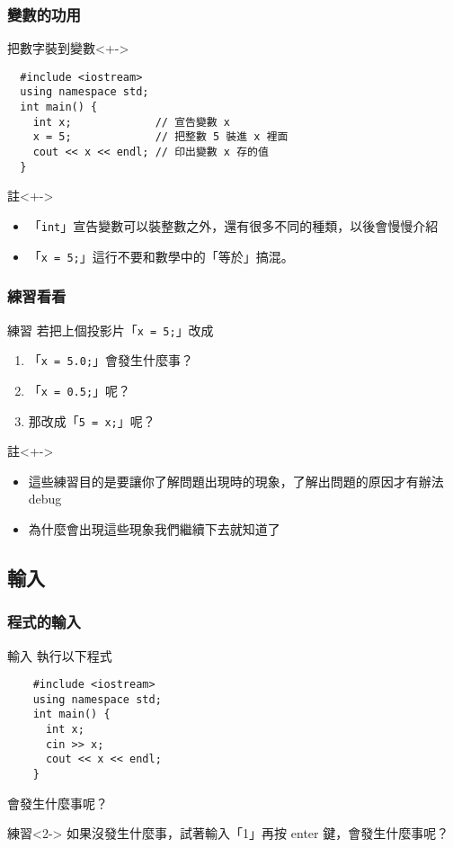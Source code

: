 \documentclass[utf8]{beamer}
\begin{document}
\begin{CJK}{UTF8}{bkai}
\begin{frame}[fragile]
  \frametitle{變數的功用}
  \begin{block}{把數字裝到變數}<+->
  \begin{lstlisting}
  #include <iostream>
  using namespace std;
  int main() {
    int x;             // 宣告變數 x
    x = 5;             // 把整數 5 裝進 x 裡面
    cout << x << endl; // 印出變數 x 存的值
  }
  \end{lstlisting}
  \end{block}
  \begin{exampleblock}{註}<+->
    \begin{itemize}
    \item 「\lstinline{int}」宣告變數可以裝整數之外，還有很多不同的種類，以後會慢慢介紹
    \item<+-> 「\lstinline{x = 5;}」這行\alert{不要}和數學中的「等於」搞混。
    \end{itemize}
  \end{exampleblock}
\end{frame}

\begin{frame}
  \frametitle{練習看看}
  \begin{block}{練習}
    若把上個投影片「\lstinline{x = 5;}」改成
    \begin{enumerate}[<+->]
    \item 「\lstinline{x = 5.0;}」會發生什麼事？
    \item 「\lstinline{x = 0.5;}」呢？
    \item 那改成「\lstinline{5 = x;}」呢？
    \end{enumerate}
  \end{block}
  \begin{exampleblock}{註}<+->
    \begin{itemize}
      \item 這些練習目的是要讓你了解\alert{問題出現時}的現象，了解出問題的原因才有辦法 debug
      \item<+-> 為什麼會出現這些現象我們繼續下去就知道了
    \end{itemize}
  \end{exampleblock}
\end{frame}

\subsection{輸入}

\begin{frame}[fragile]
  \frametitle{程式的輸入}
  \begin{block}{輸入}
    執行以下程式
    \begin{lstlisting}
    #include <iostream>
    using namespace std;
    int main() {
      int x;
      cin >> x;
      cout << x << endl;
    }
    \end{lstlisting}
    會發生什麼事呢？
  \end{block}
  \begin{block}{練習}<2->
  如果沒發生什麼事，試著輸入「1」再按 enter 鍵，會發生什麼事呢？
  \end{block}
\end{frame}


\end{CJK}
\end{document}
